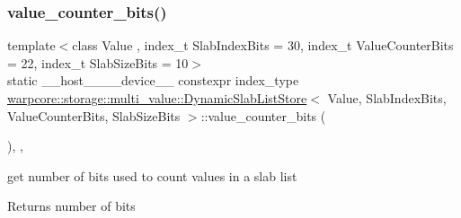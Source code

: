 \subsubsection{\texorpdfstring{value\+\_\+counter\+\_\+bits()}{value\_counter\_bits()}}
{\footnotesize\ttfamily template$<$class Value , index\+\_\+t Slab\+Index\+Bits = 30, index\+\_\+t Value\+Counter\+Bits = 22, index\+\_\+t Slab\+Size\+Bits = 10$>$ \\
static \+\_\+\+\_\+host\+\_\+\+\_\+\+\_\+\+\_\+device\+\_\+\+\_\+ constexpr index\+\_\+type \hyperlink{classwarpcore_1_1storage_1_1multi__value_1_1DynamicSlabListStore}{warpcore\+::storage\+::multi\+\_\+value\+::\+Dynamic\+Slab\+List\+Store}$<$ Value, Slab\+Index\+Bits, Value\+Counter\+Bits, Slab\+Size\+Bits $>$\+::value\+\_\+counter\+\_\+bits (\begin{DoxyParamCaption}{ }\end{DoxyParamCaption})\hspace{0.3cm}{\ttfamily [inline]}, {\ttfamily [static]}, {\ttfamily [noexcept]}}



get number of bits used to count values in a slab list 

\begin{DoxyReturn}{Returns}
number of bits 
\end{DoxyReturn}
